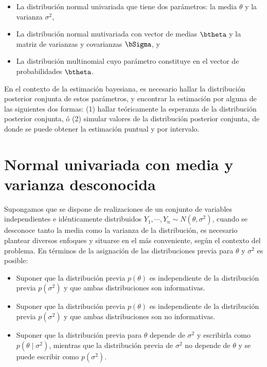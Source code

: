 \documentclass[10pt,openright]{book}\usepackage[]{graphicx}\usepackage[]{color}
\begin{document}
\begin{itemize}
\item La distribuci\'on normal univariada que tiene dos par\'ametros: la media $\theta$ y la varianza $\sigma^2$,
\item La distribuci\'on normal mutivariada con vector de medias $\btheta$ y la matriz de varianzas y covarianzas $\bSigma$, y
\item La distribuci\'on multinomial cuyo par\'ametro constituye en el vector de probabilidades $\btheta$.
\end{itemize}

En el contexto de la estimaci\'on bayesiana, es necesario hallar la distribuci\'on posterior conjunta de estos par\'ametros, y encontrar la estimaci\'on por alguna de las siguientes dos formas: (1) hallar te\'oricamente la esperanza de la distribuci\'on posterior conjunta, \'o (2) simular valores de la distribuci\'on posterior conjunta, de donde se puede obtener la estimaci\'on puntual y por intervalo.

\section{Normal univariada con media y varianza desconocida}

Supongamos que se dispone de realizaciones de un conjunto de variables independientes e id\'enticamente distribuidos $Y_1,\cdots,Y_n\sim N(\theta,\sigma^2)$, cuando se desconoce tanto la media como la varianza de la distribuci\'on, es necesario plantear diversos enfoques y situarse en el m\'as conveniente, seg\'un el contexto del problema. En t\'erminos de la asignaci\'on de las distribuciones previa para $\theta$ y $\sigma^2$ es posible:
\begin{itemize}
\item Suponer que la distribuci\'on previa $p(\theta)$ es independiente de la distribuci\'on previa $p(\sigma^2)$ y que ambas distribuciones son informativas. 
\item Suponer que la distribuci\'on previa $p(\theta)$ es independiente de la distribuci\'on previa $p(\sigma^2)$ y que ambas distribuciones son no informativas.
\item Suponer que la distribuci\'on previa para $\theta$ depende de $\sigma^2$ y escribirla como $p(\theta \mid \sigma^2)$, mientras que la distribuci\'on previa de $\sigma^2$ no depende de $\theta$ y se puede escribir como $p(\sigma^2)$.
\end{itemize}
\end{document}
